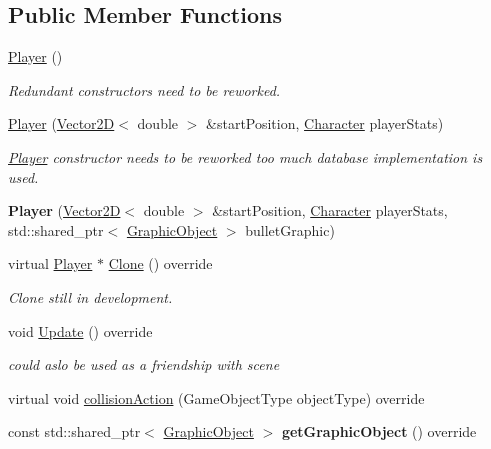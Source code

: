\subsection*{Public Member Functions}
\begin{DoxyCompactItemize}
\item 
\mbox{\label{class_player_affe0cc3cb714f6deb4e62f0c0d3f1fd8}} 
\hyperlink{class_player_affe0cc3cb714f6deb4e62f0c0d3f1fd8}{Player} ()
\begin{DoxyCompactList}\small\item\em Redundant constructors need to be reworked. \end{DoxyCompactList}\item 
\hyperlink{class_player_afb985ed4c767e1ad824655b9f5f9d597}{Player} (\hyperlink{class_vector2_d}{Vector2D}$<$ double $>$ \&start\+Position, \hyperlink{class_character}{Character} player\+Stats)
\begin{DoxyCompactList}\small\item\em \hyperlink{class_player}{Player} constructor needs to be reworked too much database implementation is used. \end{DoxyCompactList}\item 
\mbox{\label{class_player_a066cb6500937804121fd4ceb15595b3f}} 
{\bfseries Player} (\hyperlink{class_vector2_d}{Vector2D}$<$ double $>$ \&start\+Position, \hyperlink{class_character}{Character} player\+Stats, std\+::shared\+\_\+ptr$<$ \hyperlink{class_graphic_object}{Graphic\+Object} $>$ bullet\+Graphic)
\item 
\mbox{\label{class_player_ad5023c3701c11222e09906b41c604135}} 
virtual \hyperlink{class_player}{Player} $\ast$ \hyperlink{class_player_ad5023c3701c11222e09906b41c604135}{Clone} () override
\begin{DoxyCompactList}\small\item\em Clone still in development. \end{DoxyCompactList}\item 
\mbox{\label{class_player_a5e17be3418fa0ac0192c05efaf3dc8bd}} 
void \hyperlink{class_player_a5e17be3418fa0ac0192c05efaf3dc8bd}{Update} () override
\begin{DoxyCompactList}\small\item\em could aslo be used as a friendship with scene \end{DoxyCompactList}\item 
virtual void \hyperlink{class_player_a965e7e8baf9b270e1b22784b890bc74d}{collision\+Action} (Game\+Object\+Type object\+Type) override
\item 
\mbox{\label{class_player_a0bee9292374b568f74c2f9240fba0d36}} 
const std\+::shared\+\_\+ptr$<$ \hyperlink{class_graphic_object}{Graphic\+Object} $>$ {\bfseries get\+Graphic\+Object} () override
\end{DoxyCompactItemize}
